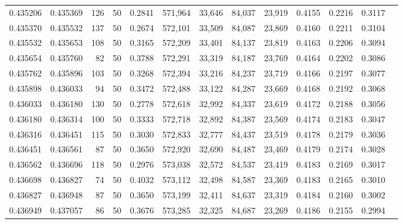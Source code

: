 \begin{tabular}{rrrrrrrrrrrrr}
0.435206 & 0.435369 &   126 &  50 &                                     0.2841 & 571,964 &  33,646 &  84,037 &  23,919 & 0.4155 & 0.2216 & 0.3117 \\
0.435370 & 0.435532 &   137 &  50 &                                     0.2674 & 572,101 &  33,509 &  84,087 &  23,869 & 0.4160 & 0.2211 & 0.3104 \\
0.435532 & 0.435653 &   108 &  50 &                                     0.3165 & 572,209 &  33,401 &  84,137 &  23,819 & 0.4163 & 0.2206 & 0.3094 \\
0.435654 & 0.435760 &    82 &  50 &                                     0.3788 & 572,291 &  33,319 &  84,187 &  23,769 & 0.4164 & 0.2202 & 0.3086 \\
0.435762 & 0.435896 &   103 &  50 &                                     0.3268 & 572,394 &  33,216 &  84,237 &  23,719 & 0.4166 & 0.2197 & 0.3077 \\
0.435898 & 0.436033 &    94 &  50 &                                     0.3472 & 572,488 &  33,122 &  84,287 &  23,669 & 0.4168 & 0.2192 & 0.3068 \\
0.436033 & 0.436180 &   130 &  50 &                                     0.2778 & 572,618 &  32,992 &  84,337 &  23,619 & 0.4172 & 0.2188 & 0.3056 \\
0.436180 & 0.436314 &   100 &  50 &                                     0.3333 & 572,718 &  32,892 &  84,387 &  23,569 & 0.4174 & 0.2183 & 0.3047 \\
0.436316 & 0.436451 &   115 &  50 &                                     0.3030 & 572,833 &  32,777 &  84,437 &  23,519 & 0.4178 & 0.2179 & 0.3036 \\
0.436451 & 0.436561 &    87 &  50 &                                     0.3650 & 572,920 &  32,690 &  84,487 &  23,469 & 0.4179 & 0.2174 & 0.3028 \\
0.436562 & 0.436696 &   118 &  50 &                                     0.2976 & 573,038 &  32,572 &  84,537 &  23,419 & 0.4183 & 0.2169 & 0.3017 \\
0.436698 & 0.436827 &    74 &  50 &                                     0.4032 & 573,112 &  32,498 &  84,587 &  23,369 & 0.4183 & 0.2165 & 0.3010 \\
0.436827 & 0.436948 &    87 &  50 &                                     0.3650 & 573,199 &  32,411 &  84,637 &  23,319 & 0.4184 & 0.2160 & 0.3002 \\
0.436949 & 0.437057 &    86 &  50 &                                     0.3676 & 573,285 &  32,325 &  84,687 &  23,269 & 0.4186 & 0.2155 & 0.2994 \\

\end{tabular}
